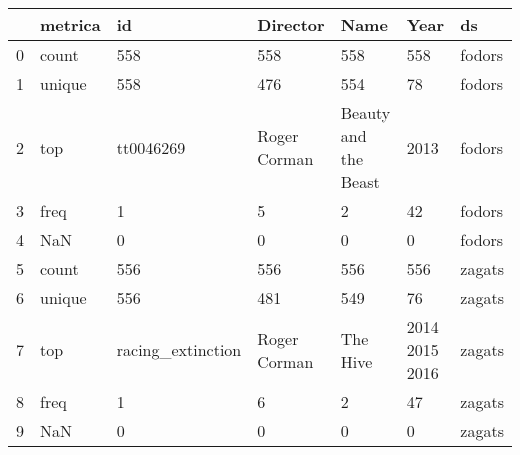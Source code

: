 \begin{tabular}{lllllll}
\toprule
{} & metrica &                 id &      Director &                  Name &            Year &      ds \\
\midrule
0 &   count &                558 &           558 &                   558 &             558 &  fodors \\
1 &  unique &                558 &           476 &                   554 &              78 &  fodors \\
2 &     top &          tt0046269 &  Roger Corman &  Beauty and the Beast &            2013 &  fodors \\
3 &    freq &                  1 &             5 &                     2 &              42 &  fodors \\
4 &     NaN &                  0 &             0 &                     0 &               0 &  fodors \\
5 &   count &                556 &           556 &                   556 &             556 &  zagats \\
6 &  unique &                556 &           481 &                   549 &              76 &  zagats \\
7 &     top &  racing\_extinction &  Roger Corman &              The Hive &  2014 2015 2016 &  zagats \\
8 &    freq &                  1 &             6 &                     2 &              47 &  zagats \\
9 &     NaN &                  0 &             0 &                     0 &               0 &  zagats \\
\bottomrule
\end{tabular}

